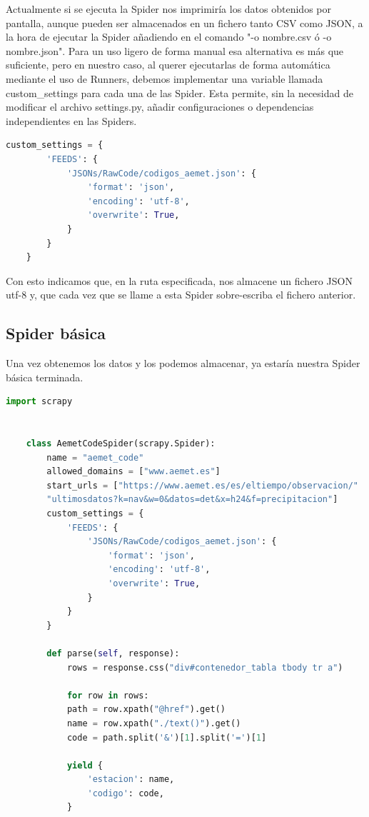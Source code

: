 Actualmente si se ejecuta la Spider nos imprimiría los datos obtenidos por pantalla, aunque pueden ser almacenados en un fichero tanto CSV como JSON, a la hora de ejecutar la Spider añadiendo en el comando "-o nombre.csv ó -o nombre.json".\newline
\newline
Para un uso ligero de forma manual esa alternativa es más que suficiente, pero en nuestro caso, al querer ejecutarlas de forma automática mediante el uso de Runners, debemos implementar una variable llamada custom\_settings para cada una de las Spider. Esta permite, sin la necesidad de modificar el archivo settings.py, añadir configuraciones o dependencias independientes en las Spiders.

\begin{lstlisting}[language=Python, caption={Confugurar guardado en JSON}]
	custom_settings = {
		'FEEDS': {
			'JSONs/RawCode/codigos_aemet.json': {
				'format': 'json',
				'encoding': 'utf-8',
				'overwrite': True,
			}
		}
	}
\end{lstlisting}

Con esto indicamos que, en la ruta especificada, nos almacene un fichero JSON utf-8 y, que cada vez que se llame a esta Spider sobre-escriba el fichero anterior.

\subsection{Spider básica}
Una vez obtenemos los datos y los podemos almacenar, ya estaría nuestra Spider básica terminada.

\begin{lstlisting}[language=Python, caption={Spider de ejemplo (Aemet Code Spider)}]
	import scrapy
	
	
	class AemetCodeSpider(scrapy.Spider):
		name = "aemet_code"
		allowed_domains = ["www.aemet.es"]
		start_urls = ["https://www.aemet.es/es/eltiempo/observacion/"
		"ultimosdatos?k=nav&w=0&datos=det&x=h24&f=precipitacion"]
		custom_settings = {
			'FEEDS': {
				'JSONs/RawCode/codigos_aemet.json': {
					'format': 'json',
					'encoding': 'utf-8',
					'overwrite': True,
				}
			}
		}
	
		def parse(self, response):
			rows = response.css("div#contenedor_tabla tbody tr a")
			
			for row in rows:
			path = row.xpath("@href").get()
			name = row.xpath("./text()").get()
			code = path.split('&')[1].split('=')[1]
			
			yield {
				'estacion': name,
				'codigo': code,
			}
\end{lstlisting}

